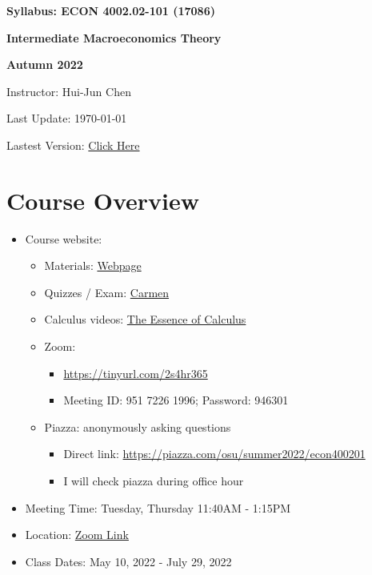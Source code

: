\documentclass[12pt]{article}
\begin{document}
\centerline{\huge\bf Syllabus: ECON 4002.02-101 (17086)}
\medskip
\centerline{\LARGE \bf Intermediate Macroeconomics Theory}
\medskip
\centerline{\LARGE \bf Autumn 2022}
\medskip
\centerline{\Large Instructor: Hui-Jun Chen}
\centerline{Last Update: \today}
\centerline{Lastest Version: \href{https://huijunchen9260.github.io/pdf/IntermediateMacroAutumn2022/syllabus/build/syllabus.pdf}{Click Here}}

\medskip

\section*{Course Overview}
\begin{itemize}

    \item Course website:
    \begin{itemize}
        \item Materials: \href{https://huijunchen9260.github.io/IntermediateMacroAutumn2022.html}{Webpage}
        \item Quizzes / Exam: \href{https://osu.instructure.com/courses/121985}{Carmen}
        \item Calculus videos: \href{https://www.youtube.com/watch?v=WUvTyaaNkzM&list=PLZHQObOWTQDMsr9K-rj53DwVRMYO3t5Yr}{The Essence of Calculus}
        \item Zoom:
        \begin{itemize}
            \item \href{https://tinyurl.com/2s4hr365}{https://tinyurl.com/2s4hr365}
            \item Meeting ID: 951 7226 1996; Password: 946301
        \end{itemize}
        \item Piazza: anonymously asking questions
        \begin{itemize}
            \item Direct link: \href{https://piazza.com/osu/summer2022/econ400201}{https://piazza.com/osu/summer2022/econ400201}
            \item I will check piazza during office hour
        \end{itemize}
    \end{itemize}
    \item Meeting Time: Tuesday, Thursday 11:40AM - 1:15PM
    \item Location: \href{https://osu.zoom.us/j/95172261996?pwd=bHVuRlU5dHlmSUx5STcycDBkOVdpZz09}{Zoom Link}
    \item Class Dates: May 10, 2022 - July 29, 2022

\end{itemize}
\end{document}
